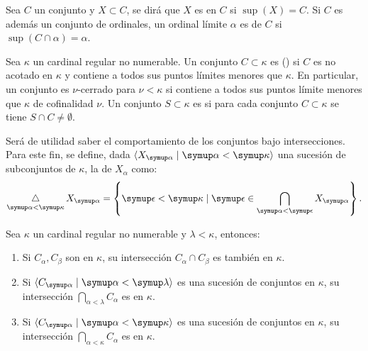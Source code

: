 \documentclass
[
  12pt,
  letterpaper,
  openany,
  oneside,
]{book}
\begin{document}
Sea $C$ un conjunto y $X\subset C$, se dirá que $X$ es 
en $C$ si $\sup(X) = C$.
Si $C$ es además un conjunto de ordinales, un ordinal límite $\alpha$ es
 de $C$ si $\sup ( C \cap\alpha ) = \alpha$.
\begin{defi}
    Sea $\kappa$ un cardinal regular no numerable. Un conjunto $C\subset \kappa$
    es  (\cna) si $C$ es no acotado en $\kappa$ y contiene a
    todos sus puntos límites menores que $\kappa$. En particular, un conjunto es $\nu$-cerrado
    para $\nu<\kappa$ si contiene a todos sus puntos límite menores que $\kappa$ de cofinalidad $\nu$.
    Un conjunto $S\subset\kappa$ es  si para cada conjunto
    \cna{} $C\subset\kappa$ se tiene $S\cap C\neq\emptyset$.
\end{defi}

Será de utilidad saber el comportamiento de los conjuntos \cna{} bajo intersecciones.
Para este fin, se define, dada $\op{X_\alpha\mid \alpha<\kappa}$ una sucesión
de subconjuntos de $\kappa$, la  de
$X_\alpha$ como:
\[
    \dint_{\alpha<\kappa}X_\alpha
    =
    \set{\epsilon<\kappa\mid\epsilon\in \bigcap_{\alpha<\epsilon}X_\alpha} .
\]

\begin{teo}\label{teo:intersection-cna}
    Sea $\kappa$ un cardinal regular no numerable y $\lambda<\kappa$, entonces:
    \begin{enumerate}[label=(\roman*)]
        \item Si $C_\alpha,C_\beta$ son \cna{} en $\kappa$, su intersección
            $C_\alpha\cap C_\beta$ es también \cna{} en $\kappa$.
        \item Si $\seq{C_\alpha\mid\alpha<\lambda}$ es una sucesión de conjuntos \cna{}
            en $\kappa$, su intersección $\bigcap_{\alpha<\lambda}C_\alpha$ es \cna{} en $\kappa$.
        \item Si $\seq{C_\alpha\mid\alpha<\kappa}$ es una sucesión de conjuntos \cna{}
            en $\kappa$, su intersección $\dint_{\alpha<\kappa}C_\alpha$ es \cna{} en $\kappa$.
    \end{enumerate}
\end{teo}
\end{document}
